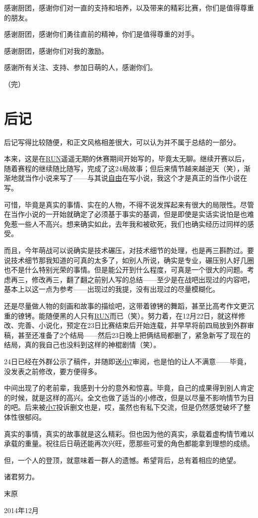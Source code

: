 感谢厨团，感谢你们对一直的支持和培养，以及带来的精彩比赛，你们是值得尊重的朋友。

感谢厨团，感谢你们勇往直前的精神，你们是值得尊重的对手。

感谢厨团，感谢你们对我的激励。

感谢所有关注、支持、参加日萌的人，感谢你们。

（完）

\chapter*{后记}

后记写得比较随便，和正文风格相差很大，可以认为并不属于总结的一部分。

本来，这是在\uline{RUN}遥遥无期的休赛期间开始写的，毕竟太无聊。继续开赛以后，随着赛程的继续随比随写，完成了这24局故事；但后来情节越来越逆天（笑），渐渐地就当作小说来写了——与其说\uline{自由}在写小说，我这个才是真正的当作小说在写。

可惜，毕竟是真实的事情、实在的人物，不得不说发挥起来有很大的局限性。尽管在当作小说的一开始就确定了必须基于事实的基调，但是即使是实话实说怕是也难免惹一些人不高兴。想来确实如此，去年我和被砍死，我们也确实经历过同样的感受。

而且，今年萌战可以说确实是技术碾压，对技术细节的处理，也是再三斟酌过。要说技术细节那我知道的可真的太多了，如别人所说，确实是专业，碾压别人好几圈也不是什么特别光荣的事情。但是能公开到什么程度，可真是一个很大的问题。考虑再三，修改再三，翻了翻之前别人写的总结——至少是在战吧出现过的内容吧，基本上以这一点为参考——出现过的我提，没有出现过的尽量模糊化。

还是尽量做人物的刻画和故事的描绘吧，这带着镣铐的舞蹈，甚至比高考作文更沉重的镣铐。能随便黑的人只有\uline{RUN}而已（笑）。努力着，在12月22日，就这样修改、完善、小说化，预定在23日比赛结束后开始连载，并早早将前四局放到外群审稿，甚至还准备了2个结局——然后23日晚上把俩结局都删了，紧急新写了现在的结局，真的我自己也没料到这样的神棍剧情（笑）。

24日已经在外群公示了稿件，并随即送\uline{小7}审阅，也是怕的让人不满意——毕竟，没发表之前修改，要方便得多。

中间出现了的老前辈，我感到十分的意外和惊喜。毕竟，自己的成果得到别人肯定的时候，就是这样的高兴。全文也做了适当的小修改，但是以尽量不影响情节为目的吧。后来被\uline{小7}投诉删文也是，哎，虽然也有私下交流，但是仍然感觉破坏了整体性很郁闷。

真实的事情，真实的故事就是这么精彩。但也因为他的真实，承载着虚构情节难以承载的重量。祝往后日萌还能再次兴旺，愿那些可爱的角色都能拿到理想的成绩。

但，一个人的登顶，就意味着一群人的遗憾。希望背后，总有着相应的绝望。

诸君努力。

\begin{flushright}
  \rm\kai 末原

  2014年12月
\end{flushright}
